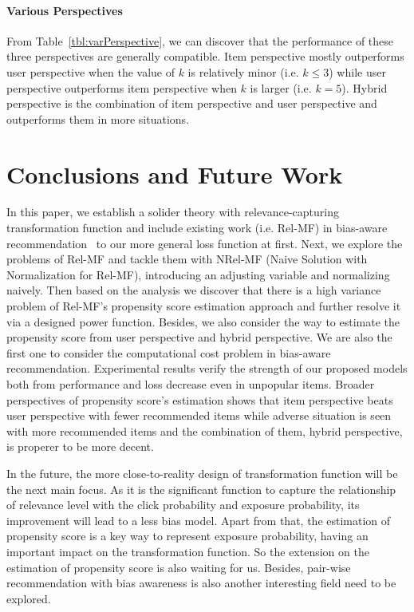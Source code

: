 \documentclass[sigconf]{acmart}
\begin{document}
\paragraph{Various Perspectives} From Table~\ref{tbl:varPerspective}, we can discover that the performance of these three perspectives are generally compatible. Item perspective mostly outperforms user perspective when the value of $k$ is relatively minor (i.e. $k \leq 3$) while user perspective outperforms item perspective when $k$ is larger (i.e. $k = 5$). Hybrid perspective is the combination of item perspective and user perspective and outperforms them in more situations.
\section{Conclusions and Future Work}
In this paper, we establish a solider theory with relevance-capturing transformation function and include existing work (i.e. Rel-MF) in bias-aware recommendation~\cite{saito2020unbiased} to our more general loss function at first. Next, we explore the problems of Rel-MF and tackle them with NRel-MF (Naive Solution with Normalization for Rel-MF), introducing an adjusting variable and normalizing naively. Then based on the analysis we discover that there is a high variance problem of Rel-MF's propensity score estimation approach and further resolve it via a designed power function. Besides, we also consider the way to estimate the propensity score from user perspective and hybrid perspective. We are also the first one to consider the computational cost problem in bias-aware recommendation. Experimental results verify the strength of our proposed models both from performance and loss decrease even in unpopular items. Broader perspectives of propensity score's estimation shows that item perspective beats user perspective with fewer recommended items while adverse situation is seen with more recommended items and the combination of them, hybrid perspective, is properer to be more decent. 

In the future, the more close-to-reality design of transformation function will be the next main focus. As it is the significant function to capture the relationship of relevance level with the click probability and exposure probability, its improvement will lead to a less bias model. Apart from that, the estimation of propensity score is a key way to represent exposure probability, having an important impact on the transformation function. So the extension on the estimation of propensity score is also waiting for us. Besides, pair-wise recommendation with bias awareness is also another interesting field need to be explored. 
\clearpage
	

\end{document}
